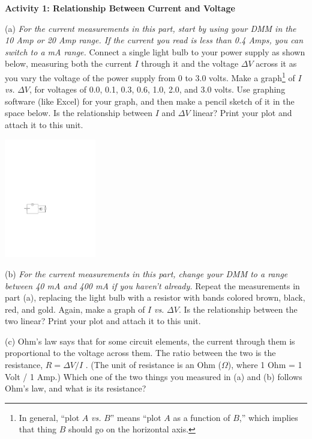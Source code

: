 \textbf{Activity 1: Relationship Between Current and Voltage}

(a) \textit{For the current measurements in this part, start by using your DMM in the 10 Amp or 20 Amp range.  If the current you read is less than 0.4 Amps, you can switch to a mA range.} Connect a single light bulb to your power supply as shown below, measuring both the current $I$ through it and the voltage $\Delta V$ across it as you vary the voltage of the power supply from 0 to 3.0 volts.  Make a graph\footnote{In general, ``plot $A$ \textit{vs.} $B$'' means ``plot $A$ as a function of $B$,'' which implies that thing $B$ should go on the horizontal axis.} of $I$ \textit{vs.} $\Delta V$, for voltages of 0.0, 0.1, 0.3, 0.6, 1.0, 2.0, and 3.0 volts.  Use graphing software (like Excel) for your graph, and then make a pencil sketch of it in the space below.  Is the relationship between $I$ and $\Delta V$ linear? Print your plot and attach it to this unit.

\hspace{0.5in}\includegraphics[width=0.3\textwidth]{electric_circuits2/circ_diag1.pdf}
\answerspace{0.5 in}

(b) \textit{For the current measurements in this part, change your DMM to a range between 40 mA and 400 mA if you haven't already.} Repeat the measurements in part (a), replacing the light bulb with a resistor with bands colored brown, black, red, and gold.  Again, make a graph of $I$ \textit{vs.} $\Delta V$.  
Is the relationship between the two linear? Print your plot and attach it to this unit.
\answerspace{1 in}

\newpage
(c) Ohm's law says that for some circuit elements, the current through them is proportional to the voltage across them.  The ratio between the two is the resistance, $R=\Delta V / I$ .  (The unit of resistance is an Ohm ($\Omega$), where 1 Ohm = 1 Volt / 1 Amp.)  Which one of the two things you measured in (a) and (b) follows Ohm's law, and what is its resistance?
\answerspace{0.7 in}

